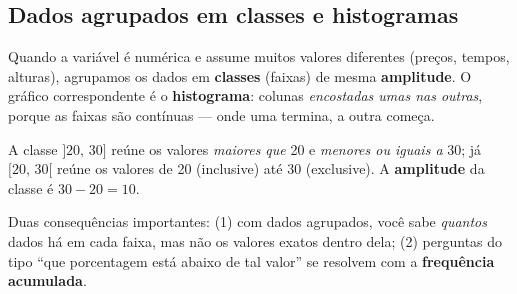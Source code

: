 \subsection{Dados agrupados em classes e histogramas}

Quando a variável é numérica e assume muitos valores diferentes (preços,
tempos, alturas), agrupamos os dados em \textbf{classes} (faixas) de mesma
\textbf{amplitude}. O gráfico correspondente é o \textbf{histograma}: colunas
\emph{encostadas umas nas outras}, porque as faixas são contínuas — onde uma
termina, a outra começa.

\begin{definicao}
A classe $]20,\,30]$ reúne os valores \emph{maiores que} 20 e \emph{menores ou
iguais a} 30; já $[20,\,30[$ reúne os valores de 20 (inclusive) até 30
(exclusive). A \textbf{amplitude} da classe é $30-20=10$.
\end{definicao}

Duas consequências importantes: (1) com dados agrupados, você sabe
\emph{quantos} dados há em cada faixa, mas não os valores exatos dentro dela;
(2) perguntas do tipo “que porcentagem está abaixo de tal valor” se resolvem
com a \textbf{frequência acumulada}.

